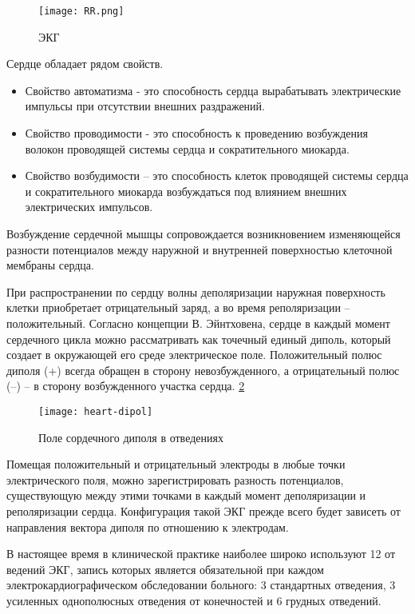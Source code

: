 \begin{figure}[h]
	\begin{center}
		\texttt{[image: RR.png]}
		\caption{ЭКГ}
		\label{ris:RR}
	\end{center}
\end{figure}

Сердце обладает рядом свойств.

\begin{itemize}
	\item Свойство автоматизма - это способность сердца вырабатывать электрические импульсы при отсутствии внешних раздражений.
	\item Свойство проводимости - это способность к проведению возбуждения волокон проводящей системы сердца и сократительного миокарда.
	\item Свойство возбудимости – это способность клеток проводящей системы сердца и сократительного миокарда возбуждаться под влиянием внешних электрических импульсов.
\end{itemize}

Возбуждение сердечной мышцы сопровождается возникновением изменяющейся разности потенциалов между наружной и внутренней поверхностью клеточной мембраны сердца.

При распространении по сердцу волны деполяризации наружная поверхность клетки приобретает отрицательный заряд, а во время реполяризации – положительный. Согласно концепции В. Эйнтховена, сердце в каждый момент сердечного цикла можно рассматривать как точечный единый диполь, который создает в окружающей его среде электрическое поле. Положительный полюс диполя (+) всегда обращен в сторону невозбужденного, а отрицательный полюс (–) – в сторону возбужденного участка сердца. \ref{ris:dipol} 

\begin{figure}[h]
	\begin{center}
		\texttt{[image: heart-dipol]}
		\caption{Поле сордечного диполя в отведениях}
		\label{ris:dipol}
	\end{center}
\end{figure}


Помещая положительный и отрицательный электроды в любые точки электрического поля, можно зарегистрировать разность потенциалов, существующую между этими точками в каждый момент деполяризации и реполяризации сердца. Конфигурация такой ЭКГ прежде всего будет зависеть от направления вектора диполя по отношению к электродам.

В настоящее время в клинической практике наиболее широко используют 12 от ведений ЭКГ, запись которых является обязательной при каждом электрокардиографическом обследовании больного: 3 стандартных отведения, 3 усиленных однополюсных отведения от конечностей и 6 грудных отведений.

